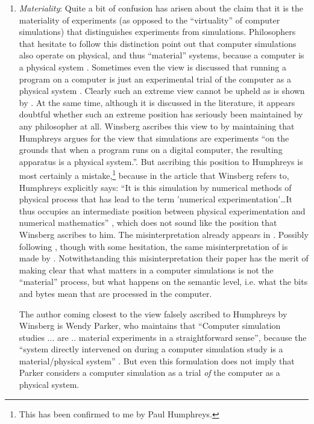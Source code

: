 \documentclass[onecollarge]{STJour}
\numberwithin{equation}{section}
\begin{document}
\begin{enumerate}
  \item \emph{Materiality}: Quite a bit of confusion has arisen about the claim that it is the materiality of experiments (as opposed to the ``virtuality'' of computer simulations) that distinguishes experiments from simulations. Philosophers that hesitate to follow this distinction point out that computer simulations also operate on physical, and thus ``material'' systems, because a computer is a physical system \cite[p. 139]{hughes:1999} \citep{parker:2009}. Sometimes even the view is discussed that running a program on a computer is just an experimental trial of the computer as a physical system \citep[p. 36, 54]{winsberg:2010}. Clearly such an extreme view cannot be upheld as is shown by \cite{barberousse-et-al:2009}. At the same time, although it is discussed in the literature, it appears doubtful whether such an extreme position has seriously been maintained by any philosopher at all. Winsberg ascribes this view to \cite{humphreys:1994} by maintaining that Humphreys argues for the view that simulations are experiments ``on the grounds that when a program runs on a digital computer, the resulting apparatus is a physical system.''\cite[p. 36]{winsberg:2010}. But ascribing this position to Humphreys is most certainly a mistake,\footnote{This has been confirmed to me by Paul Humphreys.} because in the article that Winsberg refers to, Humphreys explicitly says: ``It is this simulation by numerical methods of physical process that has lead to the term 'numerical experimentation'\ldots It thus occupies an intermediate position between physical experimentation and numerical mathematics'' \cite[p. 112]{humphreys:1994}, which does not sound like the position that Winsberg ascribes to him. The misinterpretation already appears in \citet[p. 114]{winsberg:2003}. Possibly following \cite{winsberg:2003}, though with some hesitation, the same misinterpretation of \cite{humphreys:1994} is made by \citet[p. 559/560]{barberousse-et-al:2009}. Notwithstanding this misinterpretation their paper has the merit of making clear that what matters in a computer simulations is not the ``material'' process, but what happens on the semantic level, i.e. what the bits and bytes mean that are processed in the computer. 
  
The author coming closest to the view falsely ascribed to Humphreys by Winsberg is Wendy Parker, who maintains that ``Computer simulation studies ... are .. material experiments in a straightforward sense'', because the ``system directly intervened on during a computer simulation study is a material/physical system'' \citep[p. 495]{parker:2009}. But even this formulation does not imply that Parker considers a computer simulation as a trial \emph{of} the computer as a physical system. 
  

\end{enumerate}
\end{document}
